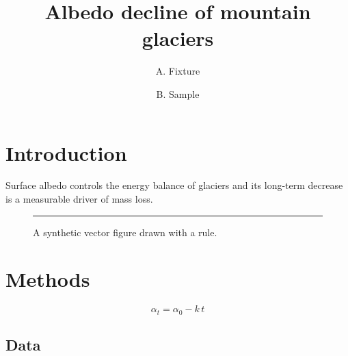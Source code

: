 \documentclass[10pt,twocolumn]{article}
\title{\Large Albedo decline of mountain glaciers}
\author{A. Fixture \and B. Sample}
\date{}
\begin{document}
\maketitle
\thispagestyle{fancy}
\section{Introduction}
Surface albedo controls the energy bal\-ance of glaciers and its long-term decrease is a measur\-able driver of mass loss. \lipsum[1-3]
\begin{figure}[t]\centering\rule{6cm}{3cm}\caption{A synthetic vector figure drawn with a rule.}\end{figure}
\section{Methods}
\lipsum[3-5]
\begin{equation}\alpha_t = \alpha_0 - k\,t \label{eq:trend}\end{equation}
\lipsum[4-8]
\subsection{Data}
\lipsum[7-10]
\end{document}
